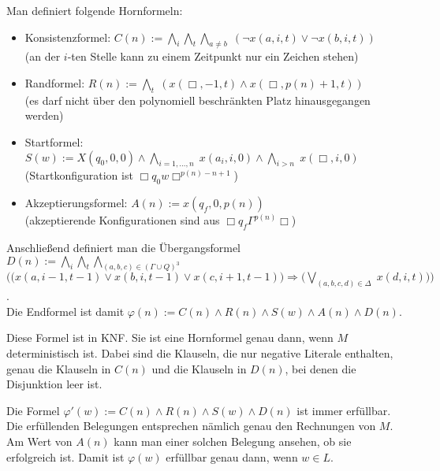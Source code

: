 \begin{Beweis}
    Man definiert folgende Hornformeln:
    \begin{itemize}
        \item
        Konsistenzformel: $C(n) := \bigwedge_i \bigwedge_t \bigwedge_{a \not= b}\;
        (\lnot x(a, i, t) \lor \lnot x(b, i, t))$\\
        (an der $i$-ten Stelle kann zu einem Zeitpunkt nur ein Zeichen stehen)

        \item
        Randformel: $R(n) := \bigwedge_t\; (x(\Box, -1, t) \land x(\Box, p(n) + 1, t))$\\
        (es darf nicht über den polynomiell beschränkten Platz hinausgegangen werden)

        \item
        Startformel: $S(w) := X(q_0, 0, 0) \land \bigwedge_{i=1,\dotsc,n}\; x(a_i, i, 0) \land
        \bigwedge_{i>n}\; x(\Box, i, 0)$\\
        (Startkonfiguration ist $\Box q_0 w \Box^{p(n)-n+1}$)

        \item
        Akzeptierungsformel: $A(n) := x(q_f, 0, p(n))$\\
        (akzeptierende Konfigurationen sind aus $\Box q_f \Gamma^{p(n)} \Box$)
    \end{itemize}
    Anschließend definiert man die Übergangsformel
    $D(n) := \bigwedge_i \bigwedge_t \bigwedge_{(a, b, c) \in (\Gamma \cup Q)^3}$\\
    $\Big(\big(x(a, i - 1, t - 1) \lor x(b, i, t - 1) \lor x(c, i + 1, t - 1)\big) \Rightarrow
    \big(\bigvee_{(a, b, c, d) \in \Delta}\; x(d, i, t)\big)\Big)$.\\
    Die Endformel ist damit $\varphi(n) := C(n) \land R(n) \land S(w) \land A(n) \land D(n)$.

    Diese Formel ist in KNF.
    Sie ist eine Hornformel genau dann, wenn $M$ deterministisch ist.
    Dabei sind die Klauseln, die nur negative Literale enthalten, genau die Klauseln in $C(n)$
    und die Klauseln in $D(n)$, bei denen die Disjunktion leer ist.

    Die Formel $\varphi'(w) := C(n) \land R(n) \land S(w) \land D(n)$ ist immer erfüllbar.
    Die erfüllenden Belegungen entsprechen nämlich genau den Rechnungen von $M$.
    Am Wert von $A(n)$ kann man einer solchen Belegung ansehen, ob sie erfolgreich ist.
    Damit ist $\varphi(w)$ erfüllbar genau dann, wenn $w \in L$.
\end{Beweis}

